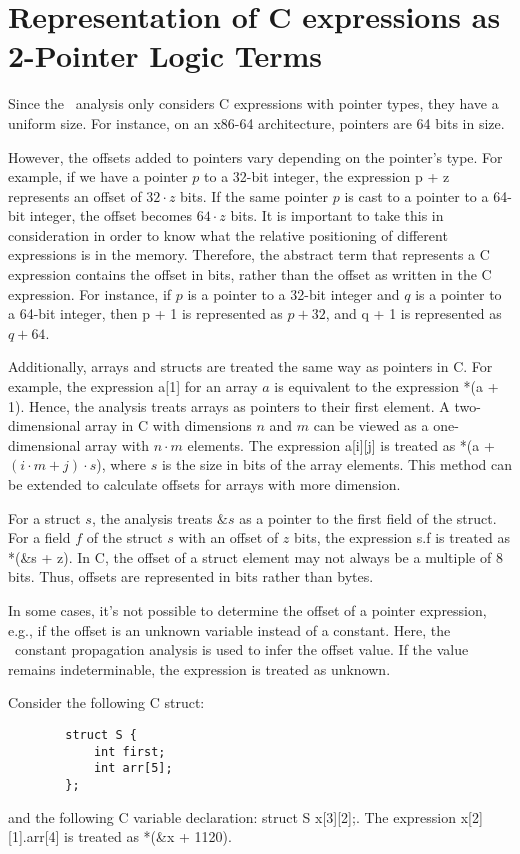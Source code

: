 \section{Representation of C expressions as 2-Pointer Logic Terms}

Since the \cpo\ analysis only considers C expressions with pointer types, they have a uniform size.
For instance, on an x86-64 architecture, pointers are 64 bits in size.

However, the offsets added to pointers vary depending on the pointer's type.
For example, if we have a pointer $p$ to a 32-bit integer,
the expression \textsf{p + z} represents an offset of $32 \cdot z$ bits.
If the same pointer $p$ is cast to a pointer to a 64-bit integer, the offset becomes $64 \cdot z$ bits.
It is important to take this in consideration in order to know what the relative positioning of
different expressions is in the memory.
Therefore, the abstract term that represents a C expression contains the offset in bits, rather than the offset as written in the C expression.
For instance, if $p$ is a pointer to a 32-bit integer and $q$ is a pointer to a 64-bit integer, then \textsf{p + 1} is represented as $p + 32$, and \textsf{q + 1} is represented as $q + 64$.

Additionally, arrays and structs are treated the same way as pointers in C.
For example, the expression \textsf{a[1]} for an array $a$ is equivalent to the expression \textsf{*(a + 1)}.
Hence, the analysis treats arrays as pointers to their first element.
A two-dimensional array in C with dimensions $n$ and $m$ can be viewed as a one-dimensional array with $n \cdot m$ elements.
The expression \textsf{a[i][j]} is treated as \textsf{*(a + $(i \cdot m + j) \cdot s$)}, where $s$ is the size in bits of the array elements.
This method can be extended to calculate offsets for arrays with more dimension.

For a struct $s$, the analysis treats $\&s$ as a pointer to the first field of the struct.
For a field $f$ of the struct $s$ with an offset of $z$ bits,
the expression \textsf{s.f} is treated as \textsf{*(\&s + z)}.
In C, the offset of a struct element may not always be a multiple of 8 bits.
Thus, offsets are represented in bits rather than bytes.

In some cases, it's not possible to determine the offset of a pointer expression,
e.g., if the offset is an unknown variable instead of a constant.
Here, the \goblint\ constant propagation analysis is used to infer the offset value.
If the value remains indeterminable, the expression is treated as unknown.

\begin{example}
    Consider the following C struct:
    \begin{verbatim}
        struct S {
            int first;
            int arr[5];
        };
    \end{verbatim}
    and the following C variable declaration: \textsf{struct S x[3][2];}.
    The expression \textsf{x[2][1].arr[4]} is treated as \textsf{*(\&x + 1120)}.
\end{example}
